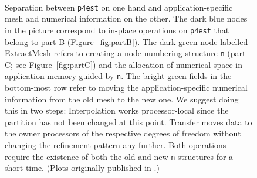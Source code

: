 \documentclass[letterpaper,11pt]{article}
\newcommand{\pforest}{\texttt{p4est}\xspace}
\newcommand{\figref}[1]{Figure~\ref{fig:#1}}
\begin{document}
\begin{figure}
\begin{center}
  \\
\end{center}
\caption{Separation between \pforest on one hand and application-specific mesh
  and numerical information on the other.
  The dark blue nodes in the picture correspond to in-place operations on
  \pforest that belong to part B (\figref{partB}).  The dark green node labelled
  ExtractMesh refers to creating a node numbering structure \texttt{n} (part C;
  see \figref{partC}) and the allocation of numerical space in application
  memory guided by \texttt{n}.  The bright green fields in the bottom-most row refer
  to moving the application-specific numerical information from the old mesh to
  the new one.  We suggest doing this in two steps: Interpolation works
  processor-local since the partition has not been changed at this point.
  Transfer moves data to the owner processors of the respective degrees of
  freedom without changing the refinement pattern any further.  Both operations
  require the existence of both the old and
  new \texttt{n} structures for a short time.
  (Plots originally published in \cite{BursteddeGhattasStadlerEtAl08}.)
}%
\label{fig:meshes}%
\end{figure}%



\end{document}
